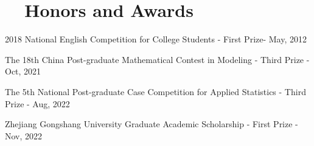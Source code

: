 \documentclass[a4paper,20pt]{article}
\begin{document}
\section{~~Honors and Awards}
\begin{description}[font=$\bullet$]
  \item {2018 National English Competition for College Students - First Prize- May, 2012}
  \vspace{-5pt}
  \item {The 18th China Post-graduate Mathematical Contest in Modeling - Third Prize - Oct, 2021}
  \vspace{-5pt}
  \item {The 5th National Post-graduate Case Competition for Applied Statistics - Third Prize - Aug, 2022}
  \vspace{-5pt}
  \item {Zhejiang Gongshang University Graduate Academic Scholarship - First Prize - Nov, 2022}

\end{description}
\end{document}
